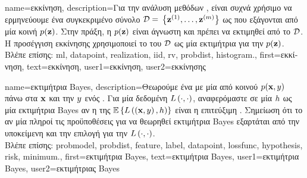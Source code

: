 {name={\foreignlanguage{greek}{εκκίνηση}},
	description={\foreignlanguage{greek}{Για την ανάλυση μεθόδων} 
		, \foreignlanguage{greek}{είναι συχνά χρήσιμο να ερμηνεύουμε ένα συγκεκριμένο σύνολο}  
		 $\mathcal{D} = $ %
		$\big\{ {\bf z}^{(1)}, \ldots, {\bf z}^{(m)}\big\}$ 
		\foreignlanguage{greek}{ως}    
		\foreignlanguage{greek}{που εξάγονται από μία κοινή}  $p({\bf z})$. 
		\foreignlanguage{greek}{Στην πράξη, η}  $p({\bf z})$ \foreignlanguage{greek}{είναι 
		άγνωστη και πρέπει να εκτιμηθεί από το $\mathcal{D}$. Η προσέγγιση εκκίνησης χρησιμοποιεί το} 
		 \foreignlanguage{greek}{του $\mathcal{D}$ ως μία εκτιμήτρια για την} $p({\bf z})$. \\
		\foreignlanguage{greek}{Βλέπε επίσης:} \gls{ml}, \gls{datapoint}, \gls{realization}, \gls{iid}, \gls{rv}, \gls{probdist}, \gls{histogram}.},
	first={\foreignlanguage{greek}{εκκίνηση}},
	text={\foreignlanguage{greek}{εκκίνηση}},
	user1={\foreignlanguage{greek}{εκκίνηση}}, %
	user2={\foreignlanguage{greek}{εκκίνησης}} %
}

{name={\foreignlanguage{greek}{εκτιμήτρια} Bayes},
	description={\foreignlanguage{greek}{Θεωρούμε ένα} 
		 \foreignlanguage{greek}{με μία από κοινού}  $p({\bf x},y)$ 
		\foreignlanguage{greek}{πάνω στα}  ${\bf x}$ \foreignlanguage{greek}{και την}  
		$y$ \foreignlanguage{greek}{ενός} . \foreignlanguage{greek}{Για μία δεδομένη} 
		 $L\left(\cdot,\cdot \right)$, \foreignlanguage{greek}{αναφερόμαστε σε μία}  
		$h$ \foreignlanguage{greek}{ως μία εκτιμήτρια} Bayes \foreignlanguage{greek}{αν η}  
		\foreignlanguage{greek}{της $\mathbb{E}\left\{L\left(\left( {\bf x},y \right),h \right)\right\}$ είναι η} 
		 \foreignlanguage{greek}{επιτεύξιμη}  \cite{LC}. \foreignlanguage{greek}{Σημείωση 
		ότι το αν μία}  \foreignlanguage{greek}{πληροί τις προϋποθέσεις για να θεωρηθεί εκτιμήτρια} Bayes 
		\foreignlanguage{greek}{εξαρτάται από την υποκείμενη}  \foreignlanguage{greek}{και την επιλογή για 
		την}  $L\left(\cdot,\cdot \right)$.\\
		\foreignlanguage{greek}{Βλέπε επίσης:} \gls{probmodel}, \gls{probdist}, \gls{feature}, \gls{label}, \gls{datapoint}, \gls{lossfunc}, 
		\gls{hypothesis}, \gls{risk}, \gls{minimum}.},
	first={\foreignlanguage{greek}{εκτιμήτρια} Bayes},
	text={\foreignlanguage{greek}{εκτιμήτρια} Bayes},
	user1={\foreignlanguage{greek}{εκτιμήτρια} Bayes}, %
    	user2={\foreignlanguage{greek}{εκτιμήτριας} Bayes} %
}

